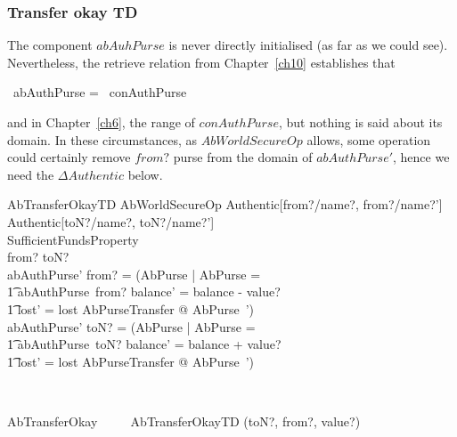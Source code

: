 \subsubsection{Transfer okay TD}

The component $abAuhPurse$ is never directly initialised (as far as we could see).
Nevertheless, the retrieve relation from Chapter~\ref{ch10} establishes that
\begin{gzed}
 \dom~abAuthPurse = \dom~conAuthPurse
\end{gzed}
and in Chapter~\ref{ch6}, the range of $conAuthPurse$, but nothing is said about
its domain. In these circumstances, as $AbWorldSecureOp$ allows, some operation could
certainly remove $from?$ purse from the domain of $abAuthPurse'$, hence we need the
$\Delta Authentic$ below.

\begin{LSDef}
\begin{schema}{AbTransferOkayTD}
  AbWorldSecureOp
\where
  \Delta Authentic[from?/name?, from?/name?']\\
  \Delta Authentic[toN?/name?, toN?/name?']\\
  SufficientFundsProperty\\
  from? \neq toN?\\
  abAuthPurse' from? = (\mu  \Delta AbPurse | \theta  AbPurse = \\
      \t1 abAuthPurse~from? \land  balance' = balance - value? \land \\
      \t1 lost' = lost \land  \Xi AbPurseTransfer @ \theta  AbPurse~')\\
  abAuthPurse' toN? = (\mu  \Delta AbPurse | \theta  AbPurse = \\
      \t1 abAuthPurse~toN? \land  balance' = balance + value? \land  \\
      \t1 lost' = lost \land  \Xi AbPurseTransfer @ \theta  AbPurse~')
\end{schema}~\end{LSDef}

\begin{LSDef}
\begin{zed}
   AbTransferOkay ~~~~ AbTransferOkayTD \hide (toN?, from?, value?)
\end{zed}~\end{LSDef}

